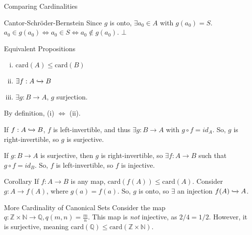 \documentclass[10pt]{extarticle}
\begin{document}
\begin{problem}{Comparing Cardinalities}
\begin{problem}{Cantor-Schröder-Bernstein}
      Since $g$ is onto, $\exists a_0\in A$ with $g(a_0) = S$. $a_0 \in g(a_0) \Leftrightarrow a_0\in S \Leftrightarrow a_0\notin g(a_0)$. $\bot$
    \end{problem}
    \begin{problem}{Equivalent Propositions}
      \begin{enumerate}[(i)]
        \item $\text{card}(A) \leq \text{card}(B)$
        \item $\exists f: A\xhookrightarrow{} B$
        \item $\exists g: B\rightarrow A$, $g$ surjection.
      \end{enumerate}
      \tcblower
      By definition, (i) $\Leftrightarrow$ (ii).
      \begin{description}[font=\normalfont]
        \item[(ii) $\Rightarrow$ (iii)] If $f: A\xhookrightarrow{} B$, $f$ is left-invertible, and thus $\exists g: B\rightarrow A$ with $g\circ f = id_A$. So, $g$ is right-invertible, so $g$ is surjective.
        \item[(iii) $\Rightarrow$ (ii)] If $g: B \rightarrow A$ is surjective, then $g$ is right-invertible, so $\exists f: A\rightarrow B$ such that $g\circ f = id_B$. So, $f$ is left-invertible, so $f$ is injective.
      \end{description}
    \end{problem}
    \begin{problem}{Corollary}
      If $f: A\rightarrow B$ is any map, $\text{card}(f(A)) \leq \text{card}(A)$.
      \tcblower
      Consider $g: A\rightarrow f(A)$, where $g(a) = f(a)$. So, $g$ is onto, so $\exists$ an injection $f(A) \xhookrightarrow{} A$.
    \end{problem}
    \begin{problem}{More Cardinality of Canonical Sets}
      Consider the map $q: \mathbb{Z} \times \mathbb{N} \rightarrow \mathbb{Q}, q(m,n) = \frac{m}{n}$. This map is \textit{not} injective, as $2/4 = 1/2$. However, it is surjective, meaning $\text{card}(\mathbb{Q}) \leq \text{card}(\mathbb{Z} \times \mathbb{N})$.\\


\end{problem}
\end{problem}
\end{document}
